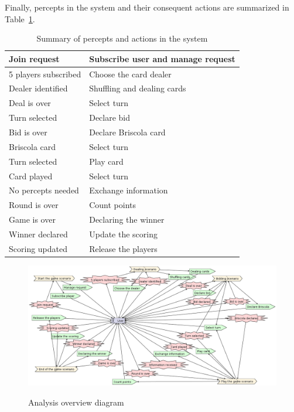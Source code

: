 \documentclass[a4paper]{article}
\begin{document}
Finally, percepts in the system and their consequent actions are summarized in Table~\ref{table:inout}.

\begin{table}[htp]
  \centering
  \begin{tabular}{|l|l|}
    \hline
    Join request	& Subscribe user and manage request  \\
    \hline
    5 players subscribed	& Choose the card dealer \\
    \hline
    Dealer identified	& Shuffling and dealing cards  \\
    \hline
    Deal is over	& Select turn \\
    \hline
    Turn selected	& Declare bid \\
    \hline
    Bid is over	& Declare Briscola card \\ 
    \hline
    Briscola card	& Select turn  \\
    \hline
    Turn selected	& Play card  \\
    \hline
    Card played	& Select turn\\
    \hline
    No percepts needed & Exchange information \\
    \hline
    Round is over	& Count points \\
    \hline
    Game is over	& Declaring the winner \\
    \hline
    Winner declared	 & Update the scoring \\
    \hline
    Scoring updated	& Release the players \\
    \hline
  \end{tabular}
  \label{table:inout}
  \caption{Summary of percepts and actions in the system}
\end{table}


\begin{figure}[htp]
  \centering
  \includegraphics[keepaspectratio,scale=0.35]{pdt/images/system_specification/analysis_overview.png}
  \label{fig:analysis}
  \caption{Analysis overview diagram}
\end{figure}
\end{document}
